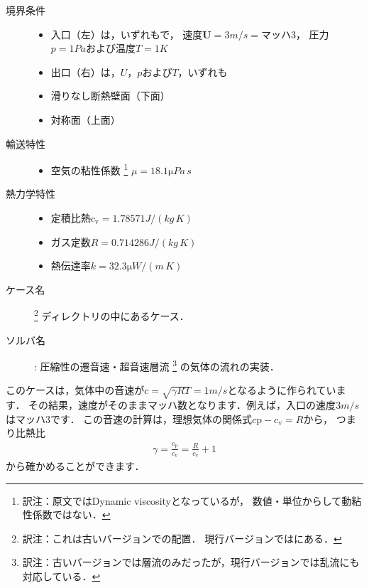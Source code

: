 \begin{description}
 \item[境界条件] \mbox{}
            \begin{itemize}
             \item 入口（左）は，いずれもで，
                   速度$\bm{U} = 3 \unit{m/s} = \text{マッハ}3$，
                   圧力$p = 1 \unit{Pa}$および温度$T = 1 \unit{K}$
             \item 出口（右）は，$U$，$p$および$T$，いずれも
             \item 滑りなし断熱壁面（下面）
             \item 対称面（上面）
            \end{itemize}
 \item[輸送特性] \mbox{}
            \begin{itemize}
             \item 空気の粘性係数%
\footnote{訳注：原文ではDynamic viscosityとなっているが，
数値・単位からして動粘性係数ではない．}%
                   $\mu = 18.1 \unit{\micro Pa\,s}$
            \end{itemize}
 \item[熱力学特性] \mbox{}
            \begin{itemize}
             \item 定積比熱$c_{\mathrm{v}} = 1.78571 \unit{J/(kg\,K)}$
             \item ガス定数$R = 0.714286 \unit{J/(kg\,K)}$
             \item 熱伝達率$k = 32.3 \unit{\micro W/(m\,K)}$
            \end{itemize}
 \item[ケース名] %
\footnote{訳注：これは古いバージョンでの配置．
現行バージョンではにある．}%
            ディレクトリの中にあるケース．
 \item[ソルバ名] : 圧縮性の遷音速・超音速層流%
\footnote{訳注：古いバージョンでは層流のみだったが，現行バージョンでは乱流にも対応している．}%
            の気体の流れの実装．
\end{description}

このケースは，気体中の音速が$c = \sqrt{\gamma RT} = 1 \unit{m/s}$となるように作られています．
その結果，速度がそのままマッハ数となります．例えば，入口の速度$3 \unit{m/s}$はマッハ$3$です．
この音速の計算は，理想気体の関係式$c{\mathrm{p}} - c_{\mathrm{v}} = R$から，
つまり比熱比
\begin{align}
 \label{eq:3.12}
 \gamma = \frac{c_{\mathrm{p}}}{c_{\mathrm{v}}} = \frac{R}{c_{\mathrm{v}}} + 1
\end{align}
から確かめることができます．


